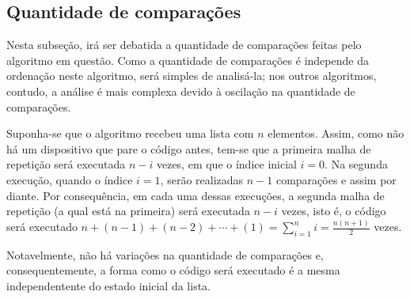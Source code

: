 \subsection{Quantidade de comparações}
Nesta subseção, irá ser debatida a quantidade de comparações feitas pelo algoritmo em questão. Como a quantidade de comparações é independe da ordenação neste algoritmo, será simples de analisá-la; nos outros algoritmos, contudo, a análise é mais complexa devido à oscilação na quantidade de comparações.

Suponha-se que o algoritmo recebeu uma lista com $n$ elementos. Assim, como não há um dispositivo que pare o código antes, tem-se que a primeira malha de repetição será executada $n-i$ vezes, em que o índice inicial $i=0$. Na segunda execução, quando o índice $i=1$, serão realizadas $n-1$ comparações e assim por diante. Por consequência, em cada uma dessas execuções, a segunda malha de repetição (a qual está na primeira) será executada $n-i$ vezes, isto é, o código será executado $n+(n-1)+(n-2)+\cdots+(1) = \sum_{i=1}^n i = \frac{n(n+1)}{2}$ vezes.

Notavelmente, não há variações na quantidade de comparações e, consequentemente, a forma como o código será executado é a mesma independentente do estado inicial da lista.